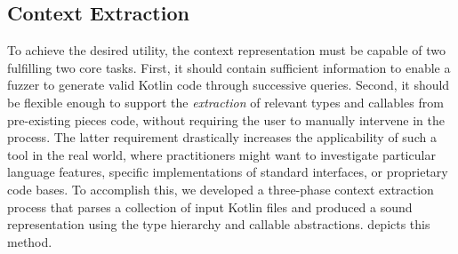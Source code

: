 \subsection{\label{subsec:context-extraction}Context Extraction}

To achieve the desired utility, the context representation
must be capable of two fulfilling two core tasks.
First, it should contain sufficient information to enable a fuzzer to generate valid Kotlin
code through successive queries.
Second, it should be flexible enough to support the \textit{extraction} of relevant types
and callables from pre-existing pieces code, without requiring the user to manually
intervene in the process.
The latter requirement drastically increases the applicability of such a tool in
the real world, where practitioners might want to investigate particular language features,
specific implementations of standard interfaces, or proprietary 
code bases. To accomplish this, we developed a three-phase context extraction
process that parses a collection of input Kotlin files and produced a
sound representation using the type hierarchy and callable abstractions.
 depicts this method.

\def\layersep{0.5}
\def\nodesep{0.5}


